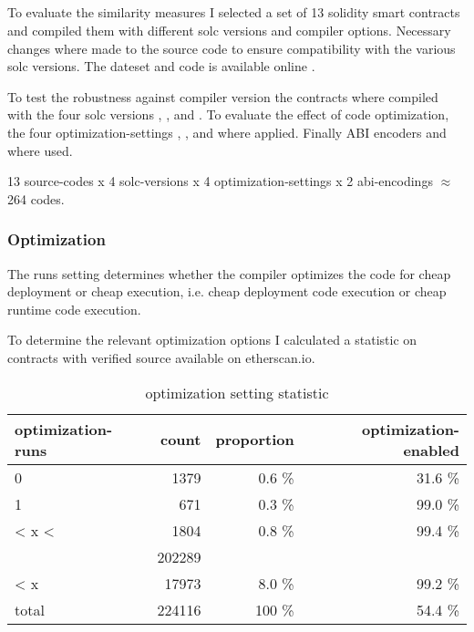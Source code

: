 \documentclass[../main.tex]{subfiles}
\begin{document}
\subsection{\n{\solcts} \label{sec:solcts}}
To evaluate the similarity measures I selected a set of 13 solidity smart contracts and compiled
them with different solc versions and compiler options.
Necessary changes where made to the source code to ensure compatibility with the various solc
versions.
The dateset and code is available online \cite{solc-versions-testset}.

To test the robustness against compiler version the contracts where compiled with the four solc versions , ,  and .
To evaluate the effect of code optimization, the four optimization-settings , ,  and  where applied.
Finally ABI encoders  and  where used.

13 source-codes x 4 solc-versions x 4 optimization-settings x 2 abi-encodings $\approx$ 264 codes.

\subsubsection{Optimization}
The runs setting determines whether the compiler optimizes the code for cheap deployment or cheap execution, i.e. cheap deployment code execution or cheap runtime code execution.

To determine the relevant optimization options I calculated a statistic  on contracts with verified source available on etherscan.io.

\begin{table*}[ht]
  \centering
  \scriptsize
  \begin{tabular}{lrrr}
    optimization-runs & count  & proportion           & optimization-enabled \\
    \hline
    0                 & 1379   & 0.6 \%               & 31.6 \%              \\
    1                 & 671    & 0.3 \%               & 99.0 \%              \\
    < x <             & 1804   & 0.8 \%               & 99.4 \%              \\
    \color{red}{200}  & 202289 & \color{red}{90.3 \%} & \color{red}{50.0 \%} \\
    < x               & 17973  & 8.0 \%               & 99.2 \%              \\
    \hline
    total             & 224116 & 100 \%               & 54.4 \%
  \end{tabular}
  \caption{optimization setting statistic}
  \label{tbl:opti_stat}
\end{table*}
\end{document}
